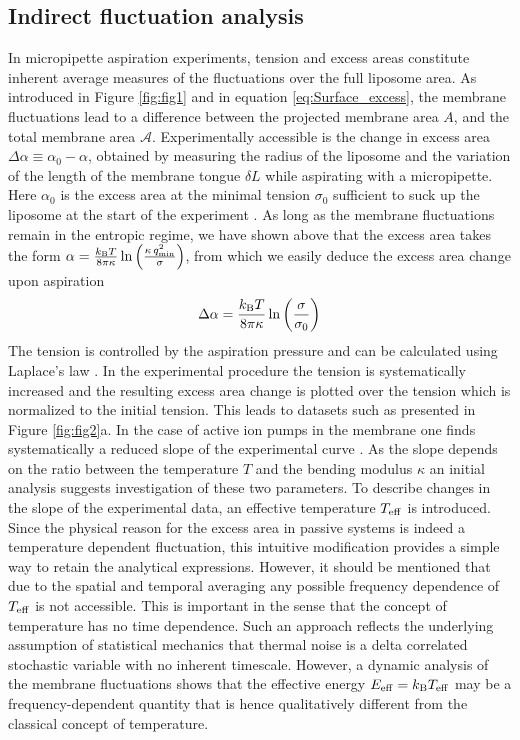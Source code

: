\documentclass[graybox]{svmult}
\begin{document}
\subsection{Indirect fluctuation analysis}
In micropipette aspiration experiments, tension and excess areas constitute inherent average measures of the fluctuations over the full liposome area. As introduced in Figure \ref{fig:fig1} and in equation \eqref{eq:Surface_excess}, the membrane fluctuations lead to a difference between the projected membrane area $A$, and the total membrane area $\mathcal{A}$. Experimentally accessible is the change in excess area $\Delta \alpha \equiv \alpha_0 - \alpha$, obtained by measuring the radius of the liposome and the variation of the length of the membrane tongue $\delta L$ while aspirating with a micropipette. Here $\alpha_0$ is the excess area at the minimal tension $\sigma_0$ sufficient to suck up the liposome at the start of the experiment \cite{Manneville:2001}. As long as the membrane fluctuations remain in the entropic regime, we have shown above that the excess area takes the form $\alpha = \frac{k_{\rm{B}}T}{8\pi\kappa}\ln\left(\frac{\kappa\,q_{\rm{min}}^2}{\sigma}\right)$, from which we easily deduce the excess area change upon aspiration
\begin{equation}
\Delta \alpha =\frac{k_{\rm{B}}T}{8\pi\kappa}\ln \left(\frac{\sigma}{\sigma_0}\right)
\end{equation} 
The tension is controlled by the aspiration pressure and can be calculated using Laplace's law \cite{Manneville:2001}. In the experimental procedure the tension is systematically increased and the resulting excess area change is plotted over the tension which is normalized to the initial tension. This leads to datasets such as presented in Figure \ref{fig:fig2}a. In the case of active ion pumps in the membrane one finds systematically a reduced slope of the experimental curve \cite{Manneville:2001}. As the slope depends on the ratio between the temperature $T$ and the bending modulus $\kappa$ an initial analysis suggests investigation of these two parameters. To describe changes in the slope of the experimental data, an effective temperature $T_{\rm{eff}}$ is introduced. Since the physical reason for the excess area in passive systems is indeed a temperature dependent fluctuation, this intuitive modification provides a simple way to retain the analytical expressions. However, it should be mentioned that due to the spatial and temporal averaging any possible frequency dependence of $T_{\rm{eff}}$ is not accessible. This is important in the sense that the concept of temperature has no time dependence. Such an approach reflects the underlying assumption of statistical mechanics that thermal noise is a delta correlated stochastic variable with no inherent timescale. However, a dynamic analysis of the membrane fluctuations shows that the effective energy $E_{\rm{eff}}=k_{\rm{B}}T_{\rm{eff}}$ may be a frequency-dependent quantity that is hence qualitatively different from the classical concept of temperature. 
 
\end{document}
